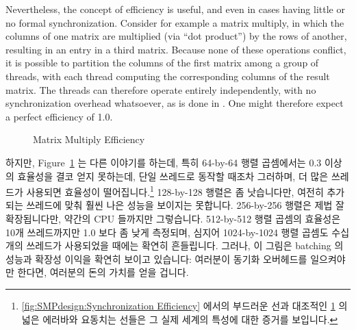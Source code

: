 Nevertheless, the concept of efficiency is useful, and even in cases
having little or no formal synchronization.
Consider for example a matrix multiply, in which the columns of one
matrix are multiplied (via ``dot product'') by the rows of another,
resulting in an entry in a third matrix.
Because none of these operations conflict, it is possible to partition
the columns of the first matrix among a group of threads, with each thread
computing the corresponding columns of the result matrix.
The threads can therefore operate entirely independently, with no
synchronization overhead whatsoever, as is done in
.
One might therefore expect a perfect efficiency of 1.0.

\fi

\begin{figure}[tbp]
\centering
{}
\caption{Matrix Multiply Efficiency}
\label{fig:SMPdesign:Matrix Multiply Efficiency}
\end{figure}

하지만,
Figure~\ref{fig:SMPdesign:Matrix Multiply Efficiency}
는 다른 이야기를 하는데, 특히 64-by-64 행렬 곱셈에서는 0.3 이상의 효율성을 결코
얻지 못하는데, 단일 쓰레드로 동작할 때조차 그러하며, 더 많은 쓰레드가 사용되면
효율성이 떨어집니다.\footnote{
	\cref{fig:SMPdesign:Synchronization Efficiency} 에서의 부드러운 선과
	대조적인
	\cref{fig:SMPdesign:Matrix Multiply Efficiency} 의 넓은 에러바와
	요동치는 선들은 그 실제 세계의 특성에 대한 증거를 보입니다.}
128-by-128 행렬은 좀 낫습니다만, 여전히 추가되는 쓰레드에 맞춰 훨씬 나은 성능을
보이지는 못합니다.
256-by-256 행렬은 제법 잘 확장됩니다만, 약간의 CPU 들까지만 그렇습니다.
512-by-512 행렬 곱셈의 효율성은 10개 쓰레드까지만 1.0 보다 좀 낮게 측정되며,
심지어 1024-by-1024 행렬 곱셈도 수십개의 쓰레드가 사용되었을 때에는 확연히
흔들립니다.
그러나, 이 그림은 batching 의 성능과 확장성 이익을 확연히 보이고 있습니다:
여러분이 동기화 오버헤드를 일으켜야만 한다면, 여러분의 돈의 가치를 얻을 겁니다.

